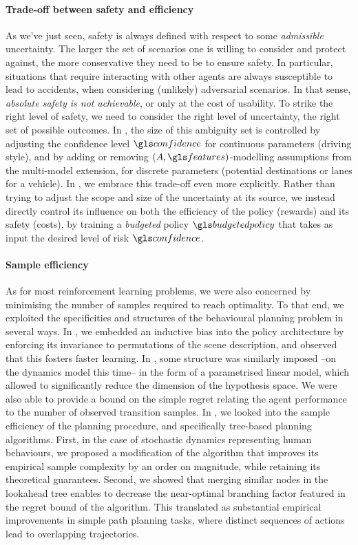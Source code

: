 \paragraph{Trade-off between safety and efficiency}
As we've just seen, safety is always defined with respect to some \emph{admissible} uncertainty. The larger the set of scenarios one is willing to consider and protect against, the more conservative they need to be to ensure safety. In particular, situations that require interacting with other agents are always susceptible to lead to accidents, when considering (unlikely) adversarial scenarios. In that sense, \emph{absolute safety is not achievable}, or only at the cost of usability. To strike the right level of safety, we need to consider the right level of uncertainty, the right set of possible outcomes. In , the size of this ambiguity set is controlled by adjusting the confidence level $\confidence$ for continuous parameters (\eg driving style), and by adding or removing $(A,\features)$-modelling assumptions from the multi-model extension, for discrete parameters (\eg potential destinations or lanes for a vehicle). In , we embrace this trade-off even more explicitly. Rather than trying to adjust the scope and size of the uncertainty at its source, we instead directly control its influence on both the efficiency of the policy (rewards) and its safety (costs), by training a \emph{budgeted} policy $\budgetedpolicy$ that takes as input the desired level of risk $\confidence$.

\paragraph{Sample efficiency}
As for most reinforcement learning problems, we were also concerned by minimising the number of samples required to reach optimality. To that end, we exploited the specificities and structures of the behavioural planning problem in several ways. In , we embedded an inductive bias into the policy architecture by enforcing its invariance to permutations of the scene description, and observed that this fosters faster learning. In , some structure was similarly imposed --on the dynamics model this time-- in the form of a parametrised linear model, which allowed to significantly reduce the dimension of the hypothesis space. We were also able to provide a bound on the simple regret relating the agent performance to the number of observed transition samples. In , we looked into the sample efficiency of the planning procedure, and specifically tree-based planning algorithms. First, in the case of stochastic dynamics representing human behaviours, we proposed a modification of the \OLOP algorithm that improves its empirical sample complexity by an order on magnitude, while retaining its theoretical guarantees. Second, we showed that merging similar nodes in the lookahead tree enables to decrease the near-optimal branching factor featured in the regret bound of the algorithm. This translated as substantial empirical improvements in simple path planning tasks, where distinct sequences of actions lead to overlapping trajectories.


